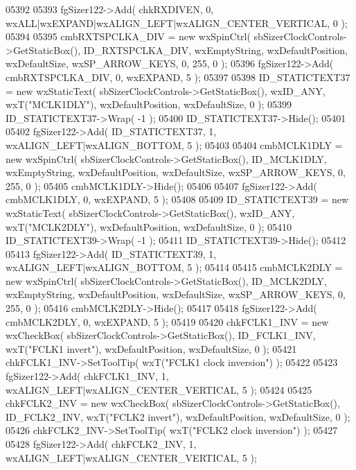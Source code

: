 \begin{DoxyCode}
05392     
05393     fgSizer122->Add( chkRXDIVEN, 0, wxALL|wxEXPAND|wxALIGN\_LEFT|wxALIGN\_CENTER\_VERTICAL, 0 );
05394     
05395     cmbRXTSPCLKA_DIV = \textcolor{keyword}{new} wxSpinCtrl( sbSizerClockControls->GetStaticBox(), 
      ID_RXTSPCLKA_DIV, wxEmptyString, wxDefaultPosition, wxDefaultSize, wxSP\_ARROW\_KEYS, 0, 255, 0 );
05396     fgSizer122->Add( cmbRXTSPCLKA_DIV, 0, wxEXPAND, 5 );
05397     
05398     ID_STATICTEXT37 = \textcolor{keyword}{new} wxStaticText( sbSizerClockControls->GetStaticBox(), wxID\_ANY, wxT(\textcolor{stringliteral}{"MCLK1DLY"}), 
      wxDefaultPosition, wxDefaultSize, 0 );
05399     ID_STATICTEXT37->Wrap( -1 );
05400     ID_STATICTEXT37->Hide();
05401     
05402     fgSizer122->Add( ID_STATICTEXT37, 1, wxALIGN\_LEFT|wxALIGN\_BOTTOM, 5 );
05403     
05404     cmbMCLK1DLY = \textcolor{keyword}{new} wxSpinCtrl( sbSizerClockControls->GetStaticBox(), 
      ID_MCLK1DLY, wxEmptyString, wxDefaultPosition, wxDefaultSize, wxSP\_ARROW\_KEYS, 0, 255, 0 );
05405     cmbMCLK1DLY->Hide();
05406     
05407     fgSizer122->Add( cmbMCLK1DLY, 0, wxEXPAND, 5 );
05408     
05409     ID_STATICTEXT39 = \textcolor{keyword}{new} wxStaticText( sbSizerClockControls->GetStaticBox(), wxID\_ANY, wxT(\textcolor{stringliteral}{"MCLK2DLY"}), 
      wxDefaultPosition, wxDefaultSize, 0 );
05410     ID_STATICTEXT39->Wrap( -1 );
05411     ID_STATICTEXT39->Hide();
05412     
05413     fgSizer122->Add( ID_STATICTEXT39, 1, wxALIGN\_LEFT|wxALIGN\_BOTTOM, 5 );
05414     
05415     cmbMCLK2DLY = \textcolor{keyword}{new} wxSpinCtrl( sbSizerClockControls->GetStaticBox(), 
      ID_MCLK2DLY, wxEmptyString, wxDefaultPosition, wxDefaultSize, wxSP\_ARROW\_KEYS, 0, 255, 0 );
05416     cmbMCLK2DLY->Hide();
05417     
05418     fgSizer122->Add( cmbMCLK2DLY, 0, wxEXPAND, 5 );
05419     
05420     chkFCLK1_INV = \textcolor{keyword}{new} wxCheckBox( sbSizerClockControls->GetStaticBox(), 
      ID_FCLK1_INV, wxT(\textcolor{stringliteral}{"FCLK1 invert"}), wxDefaultPosition, wxDefaultSize, 0 );
05421     chkFCLK1_INV->SetToolTip( wxT(\textcolor{stringliteral}{"FCLK1 clock inversion"}) );
05422     
05423     fgSizer122->Add( chkFCLK1_INV, 1, wxALIGN\_LEFT|wxALIGN\_CENTER\_VERTICAL, 5 );
05424     
05425     chkFCLK2_INV = \textcolor{keyword}{new} wxCheckBox( sbSizerClockControls->GetStaticBox(), 
      ID_FCLK2_INV, wxT(\textcolor{stringliteral}{"FCLK2 invert"}), wxDefaultPosition, wxDefaultSize, 0 );
05426     chkFCLK2_INV->SetToolTip( wxT(\textcolor{stringliteral}{"FCLK2 clock inversion"}) );
05427     
05428     fgSizer122->Add( chkFCLK2_INV, 1, wxALIGN\_LEFT|wxALIGN\_CENTER\_VERTICAL, 5 );

\end{DoxyCode}
